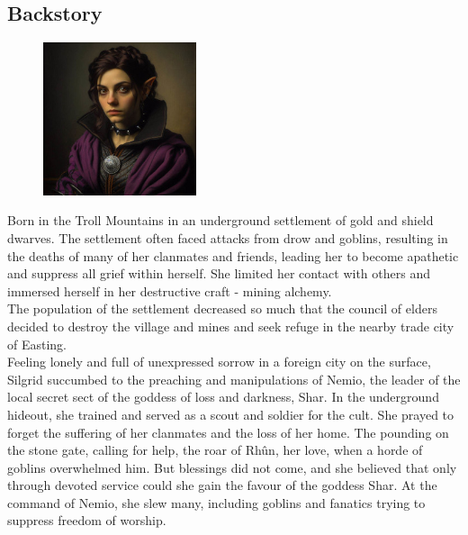 \documentclass[10pt,twocolumn,twoside,openany,bg=full,layout=true,nomultitoc]{dndbook}
\begin{document}
\subsection{Backstory}\label{subsec:silgrid-backstory}
\begin{figure}
  \begin{center}
    \includegraphics[width=0.4\textwidth]{img/silgrid}
    \vspace{1cm}
  \end{center}
\end{figure}

Born in the Troll Mountains in an underground settlement of gold and shield dwarves.
The settlement often faced attacks from drow and goblins, resulting in the deaths of many of her clanmates and friends,
leading her to become apathetic and suppress all grief within herself.
She limited her contact with others and immersed herself in her destructive craft - mining alchemy.\\

The population of the settlement decreased so much that the council of elders decided to destroy the village and mines
and seek refuge in the nearby trade city of Easting.\\

Feeling lonely and full of unexpressed sorrow in a foreign city on the surface, Silgrid succumbed to the preaching and
manipulations of Nemio, the leader of the local secret sect of the goddess of loss and darkness, Shar.
In the underground hideout, she trained and served as a scout and soldier for the cult.
She prayed to forget the suffering of her clanmates and the loss of her home.
The pounding on the stone gate, calling for help, the roar of Rhûn, her love, when a horde of goblins overwhelmed him.
But blessings did not come, and she believed that only through devoted service could she gain the favour of the goddess Shar.
At the command of Nemio, she slew many, including goblins and fanatics trying to suppress freedom of worship.\\
\end{document}
